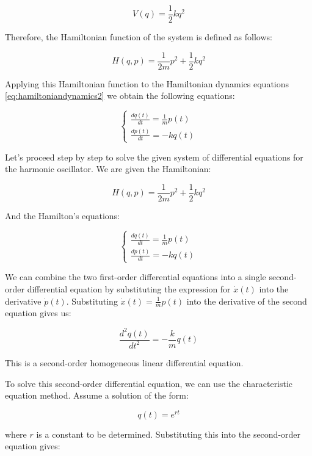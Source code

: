 \documentclass{article}
\begin{document}
\begin{equation*}
	V(q) = \frac{1}{2} k q^2
\end{equation*}

Therefore, the Hamiltonian function of the system is defined as follows:

\begin{equation}
	H(q,p) = \frac{1}{2m} p^2 + \frac{1}{2} k q^2
	\label{eq:hamiltonianharmonicoscillator}
\end{equation}

Applying this Hamiltonian function to the Hamiltonian dynamics equations \eqref{eq:hamiltoniandynamics2} we obtain the following equations:

\begin{equation*}
	\begin{cases}
		\frac{dq(t)}{dt} = \frac{1}{m} p(t) \\
		\frac{dp(t)}{dt} = -k q(t)
	\end{cases}
\end{equation*}

Let's proceed step by step to solve the given system of differential equations for the harmonic oscillator. We are given the Hamiltonian:

\[
H(q,p) = \frac{1}{2m} p^2 + \frac{1}{2} k q^2
\]

And the Hamilton's equations:

\[
	\begin{cases}
		\frac{dq(t)}{dt} = \frac{1}{m} p(t) \\
		\frac{dp(t)}{dt} = -k q(t)
	\end{cases}
\]

We can combine the two first-order differential equations into a single second-order differential equation by substituting the expression for \( \dot{x}(t) \) into the derivative \( \dot{p}(t) \). Substituting \( \dot{x}(t) = \frac{1}{m} p(t) \) into the derivative of the second equation gives us:

\[
	\frac{d^2q(t)}{dt^2} = -\frac{k}{m} q(t)
\]

This is a second-order homogeneous linear differential equation.

To solve this second-order differential equation, we can use the characteristic equation method. Assume a solution of the form:

\[
	q(t) = e^{rt}
\]

where \( r \) is a constant to be determined. Substituting this into the second-order equation gives:
\end{document}
